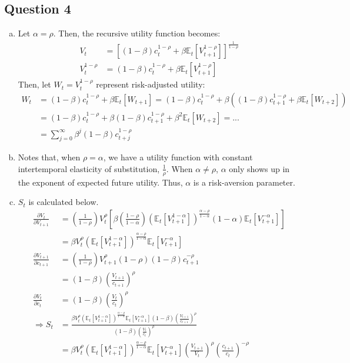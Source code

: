 \documentclass{article}
\newcommand{\Et}[1]{\mathbb{E}_t\left[#1\right]}
\begin{document}

\subsection*{Question 4}

\begin{enumerate}[(a)]
	\item Let ${\alpha=\rho}$. Then, the recursive utility function becomes:
		\begin{align*}
			V_t 			&= \left[(1-\beta)c_t^{1-\rho} + \beta\Et{V_{t+1}^{1-\rho}}\right]^{\frac{1}{1-\rho}}	\\
			V_t^{1-\rho} 	&= (1-\beta)c_t^{1-\rho} + \beta\Et{V_{t+1}^{1-\rho}}	
		\end{align*}
		Then, let ${W_t=V_t^{1-\rho}}$ represent risk-adjusted utility:
		\begin{align*}
			W_t	&= (1-\beta)c_t^{1-\rho} + \beta\Et{W_{t+1}} = (1-\beta)c_t^{1-\rho} + \beta\left((1-\beta)c_{t+1}^{1-\rho} + \beta\Et{W_{t+2}}\right)	\\
				&= (1-\beta)c_t^{1-\rho} + \beta(1-\beta)c_{t+1}^{1-\rho} + \beta^2\Et{W_{t+2}}	= ... \\
				&= \sum_{j=0}^\infty \beta^j(1-\beta)c_{t+j}^{1-\rho}
		\end{align*}
	
	\item Notes that, when ${\rho=\alpha}$, we have a utility function with constant intertemporal elasticity of substitution, $\frac{1}{\rho}$. When ${\alpha\neq\rho}$, $\alpha$ only shows up in the exponent of expected future utility. Thus, $\alpha$ is a risk-aversion parameter.
	
	\item $S_t$ is calculated below.
		\begin{align*}
			\frac{\partial V_t}{\partial V_{t+1}} &= \left(\frac{1}{1-\rho}\right)V_t^\rho\left[\beta\left(\frac{1-\rho}{1-\alpha}\right)\left(\Et{V_{t+1}^{1-\alpha}}\right)^{\frac{\alpha-\rho}{1-\alpha}}(1-\alpha)\Et{V_{t+1}^{-\alpha}}\right]	\\
				&= \beta V_t^\rho\left(\Et{V_{t+1}^{1-\alpha}}\right)^{\frac{\alpha-\rho}{1-\alpha}}\Et{V_{t+1}^{-\alpha}} \\
			\frac{\partial V_{t+1}}{\partial c_{t+1}} &= \left(\frac{1}{1-\rho}\right)V_{t+1}^\rho (1-\rho)(1-\beta)c_{t+1}^{-\rho}	\\
				&= \left(1-\beta\right)\left(\frac{V_{t+1}}{c_{t+1}}\right)^\rho	\\
			\frac{\partial V_{t}}{\partial c_{t}} &= \left(1-\beta\right)\left(\frac{V_{t}}{c_{t}}\right)^\rho	\\
\Rightarrow S_t	&= \frac{\beta V_t^\rho\left(\Et{V_{t+1}^{1-\alpha}}\right)^{\frac{\alpha-\rho}{1-\alpha}}\Et{V_{t+1}^{-\alpha}}\left(1-\beta\right)\left(\frac{V_{t+1}}{c_{t+1}}\right)^\rho}{\left(1-\beta\right)\left(\frac{V_{t}}{c_{t}}\right)^\rho}	\\
				&= \beta V_t^\rho \left(\Et{V_{t+1}^{1-\alpha}}\right)^{\frac{\alpha-\rho}{1-\alpha}}\Et{V_{t+1}^{-\alpha}}\left(\frac{V_{t+1}}{V_{t}}\right)^\rho
				\left(\frac{c_{t+1}}{c_{t}}\right)^{-\rho}
		\end{align*}
	

\end{enumerate}
\end{document}
